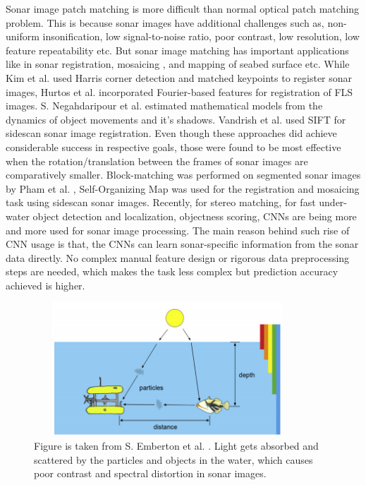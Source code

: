 Sonar image patch matching is more difficult than normal optical patch matching problem. This is because sonar images have additional challenges such as, non-uniform insonification, low signal-to-noise ratio, poor contrast, low resolution,
low feature repeatability \cite{hurtos2013automatic} etc. But sonar image matching has important applications like in sonar registration, mosaicing \cite{kim2005mosaicing}, \cite{hurtos2012fourier} and mapping of seabed surface \cite{negahdaripour2011dynamic} etc. 
While Kim et al. \cite{kim2005mosaicing} used Harris corner detection and matched keypoints to register sonar images, Hurtos et al. \cite{hurtos2012fourier} incorporated Fourier-based features for registration of FLS images. S. Negahdaripour
et al. \cite{negahdaripour2011dynamic} estimated mathematical models from the dynamics of object movements and it's shadows. Vandrish et al. \cite{vandrish2011side} used SIFT \cite{lowe2004distinctive} for sidescan sonar image registration.
Even though these approaches did achieve considerable success in respective goals, those were found to be most effective when the rotation/translation between the frames of sonar images are comparatively smaller. Block-matching was performed 
on segmented sonar images by Pham et al. \cite{pham2013guided}, Self-Organizing Map was used for the registration and mosaicing task using sidescan sonar images. Recently, \cite{zbontar2016stereo} for stereo matching, \cite{kim2016convolutional}
for fast under-water object detection and localization, \cite{valdenegro2016objectness} objectness scoring, CNNs are being more and more used for sonar image processing. The main reason behind such rise of CNN usage is that, the CNNs can learn 
sonar-specific information from the sonar data directly. No complex manual feature design or rigorous data preprocessing steps are needed, which makes the task less complex but prediction accuracy achieved is higher.


\begin{figure}[ht]
\centering
\includegraphics[width=10cm,height=5cm]{images/densenet/siamese/sonar_diagram}
\caption{Figure is taken from S. Emberton et al. \cite{emberton2018underwater}. Light gets absorbed and scattered by the particles and objects in the water, which causes poor contrast and spectral distortion in sonar images.}
\label{fig:sonar_diagram}
\end{figure}

